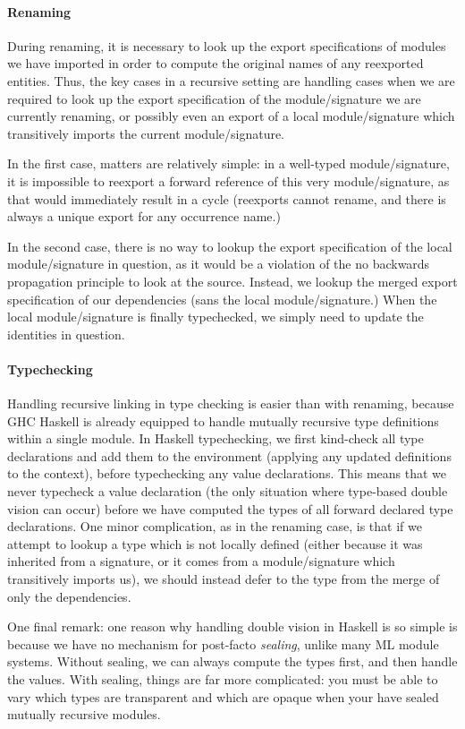 \paragraph{Renaming}
During renaming, it is necessary to look up the export specifications of
modules we have imported in order to compute the original names of any
reexported entities.  Thus, the key cases in a recursive setting are
handling cases when we are required to look up the export specification
of the module/signature we are currently renaming, or possibly even an
export of a local module/signature which transitively imports the
current module/signature.

In the first case, matters are relatively simple: in a well-typed
module/signature, it is impossible to reexport a forward reference of
this very module/signature, as that would immediately result in a cycle
(reexports cannot rename, and there is always a unique export for any
occurrence name.)

In the second case, there is no way to lookup the export specification
of the local module/signature in question, as it would be a violation of the
no backwards propagation principle to look at the source.  Instead, we
lookup the merged export specification of our dependencies (sans the local
module/signature.)  When the local module/signature is finally typechecked,
we simply need to update the identities in question.

\paragraph{Typechecking}
Handling recursive linking in type checking is easier than with
renaming, because GHC Haskell is already equipped to handle mutually
recursive type definitions within a single module.  In Haskell typechecking,
we first kind-check all type declarations and add them to the environment
(applying any updated definitions to the context), before typechecking
any value declarations.  This means that we never typecheck a value
declaration (the only situation where type-based double vision can
occur) before we have computed the types of all forward declared type
declarations.  One minor complication, as in the renaming case, is that
if we attempt to lookup a type which is not locally defined (either
because it was inherited from a signature, or it comes from a module/signature
which transitively imports us), we should instead defer to the type
from the merge of only the dependencies.

One final remark: one reason why handling double vision in Haskell is so
simple is because we have no mechanism for post-facto \emph{sealing}, unlike
many ML module systems.  Without sealing, we can always compute the types
first, and then handle the values.  With sealing, things are far more complicated:
you must be able to vary which types are transparent and which are opaque when your
have sealed mutually recursive modules.

